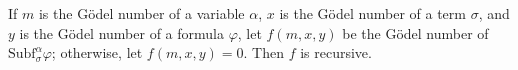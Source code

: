 If $m$ is the G\"odel number of a variable $\alpha$, $x$ is the G\"odel number of a term $\sigma$, and $y$ is the G\"odel number of a formula $\varphi$, let $f(m, x, y)$ be the G\"odel number of $\text{Subf}_{\sigma}^{\alpha}\varphi$; otherwise, let $f(m, x, y) = 0$. Then $f$ is recursive.

